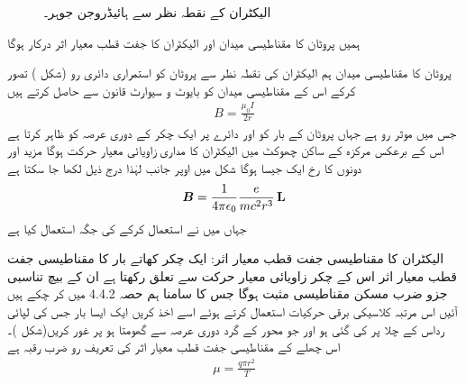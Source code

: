 \begin{figure}
\centering
{}
\caption{الیکٹران کے نقطہ نظر سے ہائیڈروجن جوہر۔}
\label{شکل_غیر_تابع_اضطراب_جوہر_الیکٹران_نقطہ_نظر}
\end{figure}

ہمیں پروٹان کا مقناطیسی میدان  اور الیکٹران کا جفت قطب معیار اثر  درکار ہوگا 

پروٹان کا مقناطیسی میدان ہم الیکٹران کی نقطہ نظر سے پروٹان کو استمراری دائری  رو (شکل )   تصور کرکے اس کے مقناطیسی میدان کو بایوٹ و سيوارٹ قانون سے حاصل کرتے ہیں 
\begin{align*} 
B = \frac{\mu_0 I}{2r}
\end{align*}
جس میں موثر رو  ہے جہاں  پروٹان کے بار کو اور  دائرے پر ایک چکر کے دوری عرصہ کو ظاہر کرتا ہے اس کے برعکس مرکزہ کے ساکن  چھوکٹ میں الیکٹران کا مداری زاویائی معیار حرکت  ہوگا مزید  اور  دونوں کا رخ ایک   جیسا ہوگا شکل  میں اوپر جانب لہٰذا   درج ذیل لکھا جا سکتا ہے 
\begin{align}
{\ensuremath{{\boldsymbol{B}}}} = \frac{1}{4 \pi \epsilon_0} \frac{e}{mc^2 r^3} \operatorname{\mathbf{L}}
\end{align}
جہاں میں نے  استعمال کرکے  کی جگہ  استعمال کیا ہے 

الیکٹران کا مقناطیسی جفت قطب معیار اثر: ایک چکر کھاتے بار کا مقناطیسی جفت قطب معیار اثر اس کے چکر زاویائی معیار حرکت سے تعلق رکھتا ہے ان کے بیچ تناسبی جزو ضرب مسکن مقناطیسی مثبت ہوگا جس کا سامنا ہم حصہ 4.4.2 میں کر چکے ہیں آئیں اس مرتبہ  کلاسیکی برقی حرکیات استعمال کرتے ہوئے اسے اخذ کریں ایک ایسا بار  جس کی لپائی  رداس  کے چلا پر  کی گئی ہو اور جو محور کے گرد دوری عرصہ  سے گھومتا ہو پر غور کریں(شکل  )۔   اس چھلے کے مقناطیسی جفت قطب معیار اثر کی تعریف رو  ضرب رقبہ  ہے 
\begin{align*}
\mu = \frac{q \pi r^2}{T}
\end{align*}

